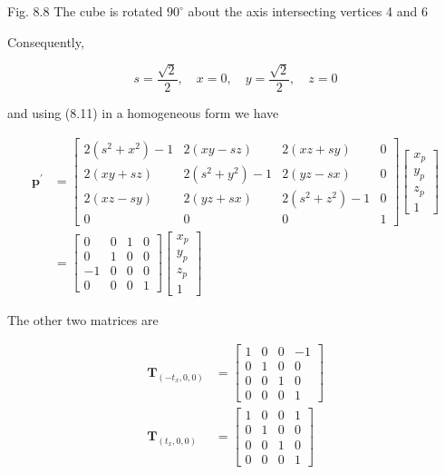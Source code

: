 \documentclass[10pt]{article}
\begin{document}
Fig. 8.8 The cube is rotated $90^{\circ}$ about the axis intersecting vertices 4 and 6

Consequently,

$$
s=\frac{\sqrt{2}}{2}, \quad x=0, \quad y=\frac{\sqrt{2}}{2}, \quad z=0
$$

and using (8.11) in a homogeneous form we have

$$
\begin{aligned}
\mathbf{p}^{\prime} & =\left[\begin{array}{cccc}
2\left(s^{2}+x^{2}\right)-1 & 2(x y-s z) & 2(x z+s y) & 0 \\
2(x y+s z) & 2\left(s^{2}+y^{2}\right)-1 & 2(y z-s x) & 0 \\
2(x z-s y) & 2(y z+s x) & 2\left(s^{2}+z^{2}\right)-1 & 0 \\
0 & 0 & 0 & 1
\end{array}\right]\left[\begin{array}{c}
x_{p} \\
y_{p} \\
z_{p} \\
1
\end{array}\right] \\
& =\left[\begin{array}{cccc}
0 & 0 & 1 & 0 \\
0 & 1 & 0 & 0 \\
-1 & 0 & 0 & 0 \\
0 & 0 & 0 & 1
\end{array}\right]\left[\begin{array}{c}
x_{p} \\
y_{p} \\
z_{p} \\
1
\end{array}\right]
\end{aligned}
$$

The other two matrices are

$$
\begin{aligned}
\mathbf{T}_{\left(-t_{x}, 0,0\right)} & =\left[\begin{array}{cccc}
1 & 0 & 0 & -1 \\
0 & 1 & 0 & 0 \\
0 & 0 & 1 & 0 \\
0 & 0 & 0 & 1
\end{array}\right] \\
\mathbf{T}_{\left(t_{x}, 0,0\right)} & =\left[\begin{array}{llll}
1 & 0 & 0 & 1 \\
0 & 1 & 0 & 0 \\
0 & 0 & 1 & 0 \\
0 & 0 & 0 & 1
\end{array}\right]
\end{aligned}
$$
\end{document}
